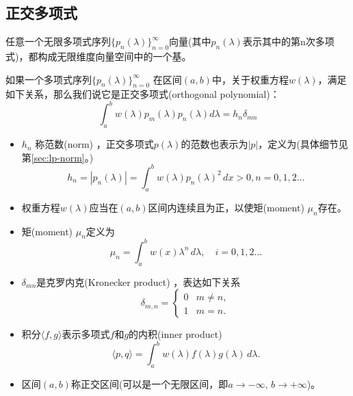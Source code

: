 \begin{subappendices}
\subsection{正交多项式}
任意一个无限多项式序列$\{p_{n}(\lambda)\}_{n=0}^{\infty}$向量(其中$p_{n}(\lambda)$表示其中的第n次多项式)，都构成无限维度向量空间中的一个基。
\begin{definition}[正交多项式]
  如果一个多项式序列$\{p_n(\lambda)\}_{n=0}^{\infty}$ 在区间$(a,b)$中，关于权重方程$w(\lambda)$，满足如下关系，那么我们说它是正交多项式(orthogonal polynomial)：
  \begin{equation}
    \label{eq:poly-orthogonal-poly-def}
    \int_a^b w(\lambda) p_m(\lambda) p_n(\lambda) d \lambda = h_n \delta_{mn}
  \end{equation}
\end{definition}
  \begin{itemize}
    \item $h_n$ 称范数(norm)  ，正交多项式$p(\lambda)$的范数也表示为$\left| p \right|$，定义为(具体细节见第\ref{sec:lp-norm}。)
    \begin{equation}
      \label{eq:poly-norm-def}
      h_n = \left| p_{n}(\lambda) \right| = \int_a^b w(\lambda) p_n(\lambda)^2 \, d x >0, n=0,1,2\ldots
    \end{equation}
    \item 权重方程$w(\lambda)$应当在$(a,b)$区间内连续且为正，以使矩(moment) $\mu_n$存在。
    \item 矩(moment) $\mu_n$定义为
    \begin{equation}
    \label{eq:poly-moment-def}
    \mu_n = \int_a^b w(x) \lambda^n \, d \lambda, \quad i=0,1,2\ldots
  \end{equation}
    \item $\delta_{mn}$是克罗内克(Kronecker product) ，表达如下关系
    \begin{equation}
      \label{eq:poly-kronecker}
      \delta_{m,n} = \begin{cases}
      0 & m \neq n, \\
      1 & m=n.
      \end{cases}
    \end{equation}
    \item 积分$\langle f, g \rangle$表示多项式$f$和$g$的内积(inner product)
    \begin{equation}
      \label{eq:poly-inner-product-def}
      \langle p,q \rangle =
      \int_a^b w(\lambda) f(\lambda) g(\lambda) \, d \lambda.
    \end{equation}
    \item 区间$(a,b)$称正交区间(可以是一个无限区间，即$a \rightarrow -\infty, \, b \rightarrow +\infty$)。
  \end{itemize}


\end{subappendices}
